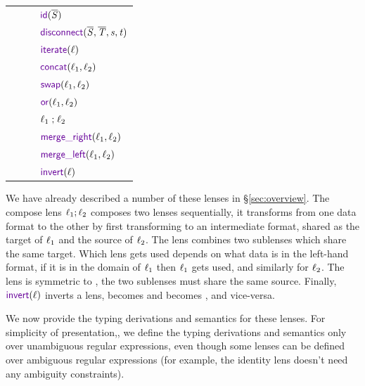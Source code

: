 \documentclass[acmsmall,screen,anonymous]{acmart}
\begin{document}
\begin{center}
  \begin{tabular}{l@{\ }l@{\ }l@{\ }l}
    \Lens{} & \GEq{} & & $\IdentityLensOf{\BRegex}$\\
            & & \GBar{} & $\DisconnectOf{\BRegex}{\BRegexAlt}{\String}{\StringAlt}$ \\
            & & \GBar{} & $\IterateLensOf{\Lens}$ \\
            & & \GBar{} & $\ConcatLensOf{\Lens_1}{\Lens_2}$ \\
            & & \GBar{} & $\SwapLensOf{\Lens_1}{\Lens_2}$ \\
            & & \GBar{} & $\OrLensOf{\Lens_1}{\Lens_2}$ \\
            & & \GBar{} & $\mathit{\ell}_1\mathrel{;}\mathit{\ell}_2$ \\
            & & \GBar{} & $\MergeROf{\Lens_1}{\Lens_2}$ \\
            & & \GBar{} & $\MergeLOf{\Lens_1}{\Lens_2}$ \\
            & & \GBar{} & $\InvertOf{\Lens}$ \\
  \end{tabular}
\end{center}

We have already described a number of these lenses in \S\ref{sec:overview}.
The compose lens $\mathit{\ell}_1 ; \mathit{\ell}_2$ composes two lenses sequentially, it
transforms from one data format to the other by first transforming to an
intermediate format, shared as the target of $\mathit{\ell}_1$ and the source of
$\mathit{\ell}_2$. The \MergeR lens combines two sublenses which share the same target.
Which lens gets used depends on what data is in the left-hand format, if it is
in the domain of $\mathit{\ell}_1$ then $\mathit{\ell}_1$ gets used, and similarly for
$\mathit{\ell}_2$.  The \MergeL lens is symmetric to \MergeR, the two sublenses must
share the same source. Finally, $\InvertOf{\Lens}$ inverts a lens, \CreateR
becomes \CreateL and \PutR becomes \PutL, and vice-versa.

We now provide the typing derivations and semantics for these lenses. For
simplicity of presentation,, we define the typing derivations and
semantics only over unambiguous regular expressions, even though some lenses can
be defined over ambiguous regular expressions (for example, the identity lens
doesn't need any ambiguity constraints).
\end{document}
